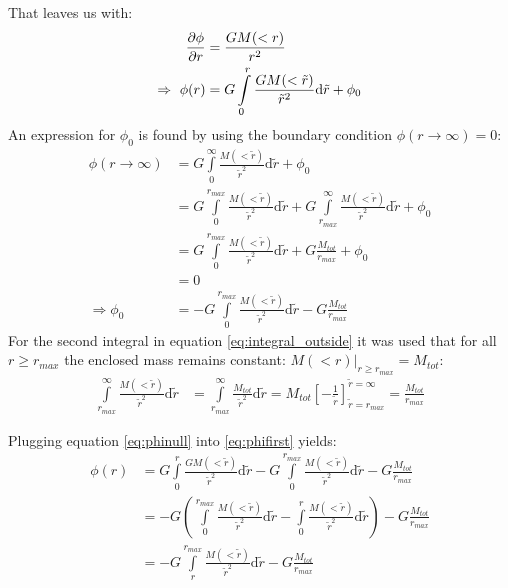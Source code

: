 \begin{appendices}
That leaves us with:
%
\begin{align}
	\frac{\partial \phi}{\partial r} &= \frac{G M(<r)}{r^2}\\
	\Rightarrow \ \phi(r) &= G \int\limits_0^{r} \frac{G M(<\tilde{r})}{\tilde{r}^2} \mathrm{d}\tilde{r} + \phi_0 \label{eq:phifirst}
\end{align}
%
An expression for $\phi_0$ is found by using the boundary condition $\phi (r \rightarrow \infty) = 0$:
\begin{align}
	\phi(r \rightarrow \infty) &= G \int\limits_{0}^{\infty} \frac{M(<\tilde{r})}{\tilde{r}^2} \mathrm{d}\tilde{r} + \phi_0\\
	&=G \int\limits_{0}^{r_{max}} \frac{M(<\tilde{r})}{\tilde{r}^2} \mathrm{d}\tilde{r}
		+ G \int\limits_{r_{max}}^{\infty} \frac{M(<\tilde{r})}{\tilde{r}^2} \mathrm{d}\tilde{r} 
		+ \phi_0  \label{eq:integral_outside}\\
	&=G \int\limits_{0}^{r_{max}} \frac{M(<\tilde{r})}{\tilde{r}^2} \mathrm{d}\tilde{r}
	+ G  \frac{M_{tot}}{r_{max}} + \phi_0\\
	&= 0 \\
	\Rightarrow \phi_0 &= - G \int\limits_{0}^{r_{max}} \frac{M(<\tilde{r})}{\tilde{r}^2} \mathrm{d}\tilde{r}
	- G  \frac{M_{tot}}{r_{max}} \label{eq:phinull}
\end{align}
%
For the second integral in equation \eqref{eq:integral_outside} it was used that for all $r\geq r_{max}$ the enclosed mass remains constant: $M(<r)|_{r\geq r_{max}} = M_{tot}$:
%
\begin{align}
	\int\limits_{r_{max}}^{\infty} \frac{M(<\tilde{r})}{\tilde{r}^2} \mathrm{d}\tilde{r} &=
		\int\limits_{r_{max}}^{\infty}\frac{M_{tot}}{\tilde{r}^2} \mathrm{d}\tilde{r}
		= M_{tot} \left[-\frac{1}{\tilde{r}} \right]_{\tilde{r}=r_{max}}^{\tilde{r}=\infty}
		= \frac{M_{tot}}{r_{max}}
\end{align}

Plugging equation \eqref{eq:phinull} into \eqref{eq:phifirst} yields:
\begin{align}
	\phi(r) &= G \int\limits_0^{r} \frac{G M(<\tilde{r})}{\tilde{r}^2} \mathrm{d}\tilde{r} - G \int\limits_{0}^{r_{max}} \frac{M(<\tilde{r})}{\tilde{r}^2} \mathrm{d}\tilde{r}
	- G  \frac{M_{tot}}{r_{max}}\\
	&= - G \left( 
				\int\limits_{0}^{r_{max}} \frac{M(<\tilde{r})}{\tilde{r}^2} \mathrm{d}\tilde{r}
				-
				\int\limits_0^{r} \frac{M(<\tilde{r})}{\tilde{r}^2} \mathrm{d}\tilde{r}
			\right)
		- G  \frac{M_{tot}}{r_{max}} \\
	&= - G \int\limits_{r}^{r_{max}} \frac{M(<\tilde{r})}{\tilde{r}^2} \mathrm{d}\tilde{r}
	- G  \frac{M_{tot}}{r_{max}}
\end{align}



\end{appendices}